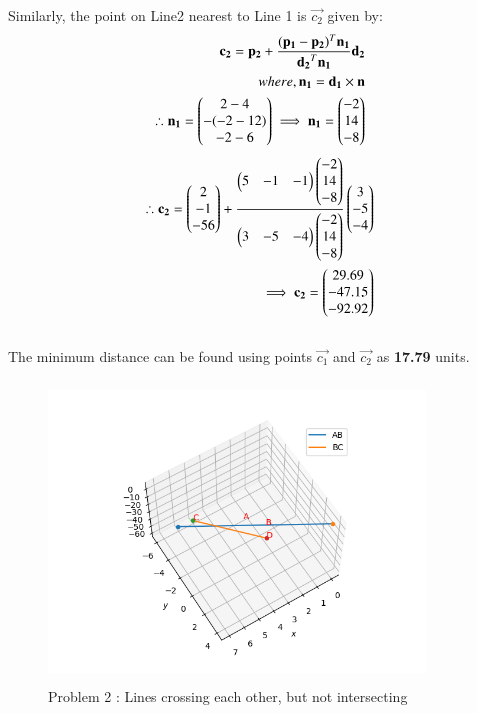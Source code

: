 \documentclass[journal,12pt,twocolumn]{IEEEtran}
\begin{document}
Similarly, the point on Line2 nearest to Line 1 is $\vec{c_2}$ given by:\\
\begin{align}
\mathbf{c_2}=\mathbf{p_2}+\frac{(\mathbf{p_1}-\mathbf{p_2})^T \mathbf{n_1}}{\mathbf{d_2}^T \mathbf{n_1}}\mathbf{d_2} \\
where, \mathbf{n_1}=\mathbf{d_1}\times \mathbf{n}\\
 \therefore \mathbf{n_1}=\begin{pmatrix}2-4 \\ -(-2-12) \\ -2-6\end{pmatrix}
\implies \mathbf{n_1}=\begin{pmatrix}-2 \\ 14 \\ -8\end{pmatrix}
\end{align}
\begin{align}
\therefore \mathbf{c_2}= \begin{pmatrix}2\\-1\\-56\end{pmatrix}+\frac{\begin{pmatrix}5&-1&-1\end{pmatrix} \begin{pmatrix}-2\\14\\-8\end{pmatrix}}{\begin{pmatrix}3&-5&-4\end{pmatrix} \begin{pmatrix}-2\\14\\-8\end{pmatrix}}\begin{pmatrix}3\\-5\\-4\end{pmatrix}\\
\implies \mathbf{c_2}=\begin{pmatrix}29.69\\ -47.15\\ -92.92\end{pmatrix}
\end{align}
\\
The minimum distance can be found using points $\vec{c_1}$ and $\vec{c_2}$ as \textbf{17.79} units.
\newpage
\begin{figure}[h!]
\centering
\includegraphics[width=10cm, height=8cm]{Figure_2}
\caption{Problem 2 : Lines crossing each other, but not intersecting}
\label{Fig4}
\end{figure}
\end{document}
